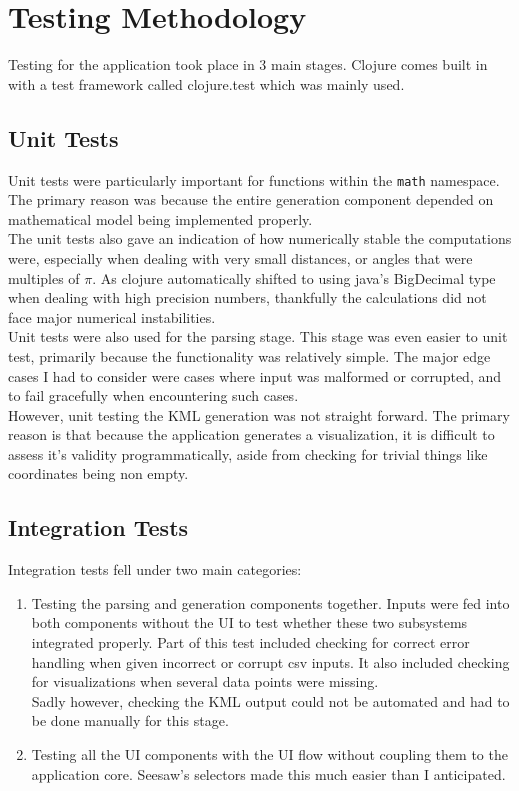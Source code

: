 \chapter{Testing Methodology}

Testing for the application took place in 3 main stages. Clojure comes built in with a test framework called clojure.test which was mainly used.

\section{Unit Tests}

Unit tests were particularly important for functions within the \lstinline{math} namespace. The primary reason was because the entire generation component depended on mathematical model being implemented properly. \\

The unit tests also gave an indication of how numerically stable the computations were, especially when dealing with very small distances, or angles that were multiples of $\pi$. As clojure automatically shifted to using java's BigDecimal type when dealing with high precision numbers, thankfully the calculations did not face major numerical instabilities.\\

Unit tests were also used for the parsing stage. This stage was even easier to unit test, primarily because the functionality was relatively simple. The major edge cases I had to consider were cases where input was malformed or corrupted, and to fail gracefully when encountering such cases. \\

However, unit testing the KML generation was not straight forward. The primary reason is that because the application generates a visualization, it is difficult to assess it's validity programmatically, aside from checking for trivial things like coordinates being non empty.

\section{Integration Tests}

Integration tests fell under two main categories:

\begin{enumerate}
\item Testing the parsing and generation components together. Inputs were fed into both components without the UI to test whether these two subsystems integrated properly. Part of this test included checking for correct error handling when given incorrect or corrupt csv inputs. It also included checking for visualizations when several data points were missing. \\
Sadly however, checking the KML output could not be automated and had to be done manually for this stage.
\item Testing all the UI components with the UI flow without coupling them to the application core. Seesaw's selectors made this much easier than I anticipated.
\end{enumerate}

